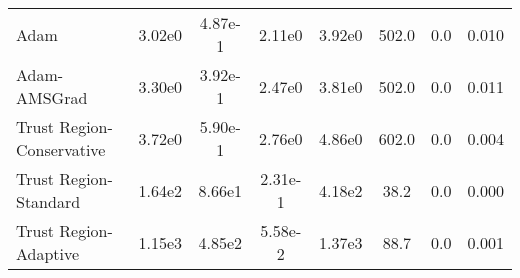 \documentclass{article}
\begin{document}
\begin{table}[htbp]
{\begin{tabular}{l*{7}{S[table-format=2.2e-1]}}
Adam & 3.02e0 & 4.87e-1 & 2.11e0 & 3.92e0 & 502.0 & 0.0 & 0.010 \\
Adam-AMSGrad & 3.30e0 & 3.92e-1 & 2.47e0 & 3.81e0 & 502.0 & 0.0 & 0.011 \\
Trust Region-Conservative & 3.72e0 & 5.90e-1 & 2.76e0 & 4.86e0 & 602.0 & 0.0 & 0.004 \\
Trust Region-Standard & 1.64e2 & 8.66e1 & 2.31e-1 & 4.18e2 & 38.2 & 0.0 & 0.000 \\
Trust Region-Adaptive & 1.15e3 & 4.85e2 & 5.58e-2 & 1.37e3 & 88.7 & 0.0 & 0.001 \\
\bottomrule
\end{tabular}
}
\end{table}
\end{document}
